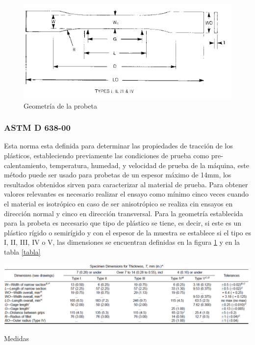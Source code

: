 \documentclass[a4paper, 11pt]{article}
\begin{document}
\begin{figure}[h!] 
\centering
\captionsetup{justification=centering}
    \includegraphics[scale=0.75]{probetas.png} 
     \caption{Geometría de la probeta}
    \label{probeta}
\end{figure}


\subsubsection{ASTM D 638-00}
Esta norma esta definida para determinar las propiedades de tracción de los plásticos, estableciendo previamente las condiciones de prueba como pre-calentamiento, temperatura, humedad, y velocidad de prueba de la máquina, este método puede ser usado para probetas de un espesor máximo de 14mm, los resultados obtenidos sirven para caracterizar al material de prueba.
Para obtener valores relevantes es necesario realizar el ensayo como mínimo cinco veces cuando el material es isotrópico en caso de ser anisotrópico se realiza cin ensayos en dirección normal y cinco en dirección transversal.
Para la geometría establecida para la probeta es necesario que tipo de plástico se tiene, es decir, si este es un plástico rígido o semirígido y con el espesor de la muestra se establece si el tipo es I, II, III, IV o V, las dimensiones se encuentran definidas en la figura \ref{probeta} y en la tabla \ref{tabla}

\begin{table}[h]
\centering
\captionsetup{justification=centering}
    \includegraphics[scale=0.4]{tabla.png} 
     \caption{Medidas}
    \label{tabla}
\end{table}
\end{document}
